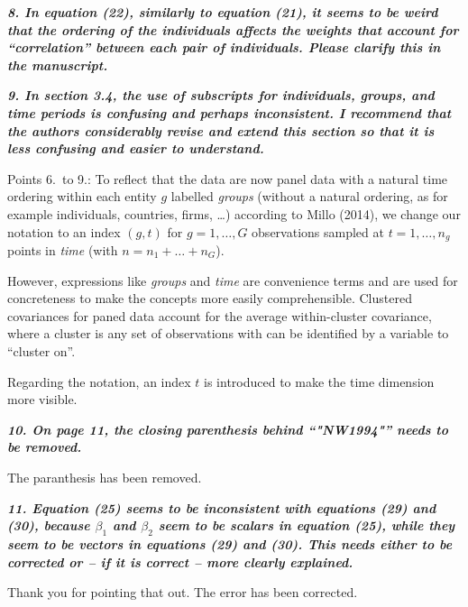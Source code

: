 \documentclass[10pt,a4paper]{article}
\begin{document}
\medskip

\textbf{\textit{8. In equation (22), similarly to equation (21), it seems to be weird that the ordering of
the individuals affects the weights that account for ``correlation'' between each pair of
individuals. Please clarify this in the manuscript.}}

\medskip

\textbf{\textit{9. In section 3.4, the use of subscripts for individuals, groups, and time periods is confusing
and perhaps inconsistent. I recommend that the authors considerably revise and extend
this section so that it is less confusing and easier to understand.}}

\medskip

 Points 6.~to 9.: To reflect that the data are now panel data with a natural time ordering within each entity $g$ labelled \emph{groups} (without a natural ordering, as for example individuals, countries, firms, \ldots) according to Millo (2014), we change our notation
to an index $(g, t)$ for $g = 1, \dots, G$ observations sampled at $t = 1, \ldots, n_g$ points in \emph{time} (with $n = n_1 + \dots + n_G$).

However, expressions like \emph{groups} and \emph{time} are convenience terms and are used for concreteness to make the concepts more easily comprehensible. Clustered covariances for paned data account for the average within-cluster covariance, where a cluster is any set of observations with can be identified by a variable to ``cluster on''. 

Regarding the notation, an index $t$ is introduced to make the time dimension more visible.

\medskip

\textbf{\textit{10. On page 11, the closing parenthesis behind ``"NW1994"'' needs to be removed.}}

\medskip

The paranthesis has been removed.

\medskip

\textbf{\textit{11. Equation (25) seems to be inconsistent with equations (29) and (30), because $\beta_1$ and
$\beta_2$ seem to be scalars in equation (25), while they seem to be vectors in equations (29)
and (30). This needs either to be corrected or -- if it is correct -- more clearly explained.}}

\medskip

Thank you for pointing that out. The error has been corrected.

\medskip
\end{document}

